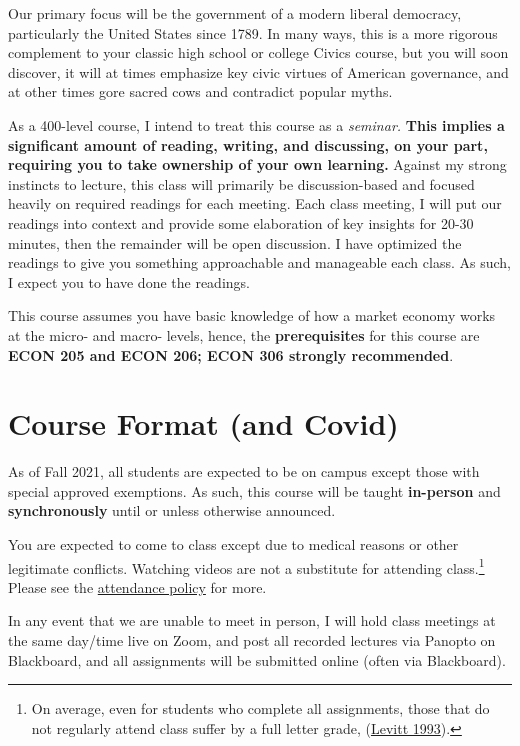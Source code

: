 \documentclass{article}
\begin{document}
Our primary focus will be the government of a modern liberal democracy,
particularly the United States since 1789. In many ways, this is a more
rigorous complement to your classic high school or college Civics
course, but you will soon discover, it will at times emphasize key civic
virtues of American governance, and at other times gore sacred cows and
contradict popular myths.

{As a 400-level course}, I intend to treat this course as a
\emph{seminar.} \textbf{This implies a significant amount of reading,
writing, and discussing, on your part, requiring you to take ownership
of your own learning.} Against my strong instincts to lecture, this
class will primarily be discussion-based and focused heavily on required
readings for each meeting. Each class meeting, I will put our readings
into context and provide some elaboration of key insights for 20-30
minutes, then the remainder will be open discussion. I have optimized
the readings to give you something approachable and manageable each
class. As such, I expect you to have done the readings.

This course assumes you have basic knowledge of how a market economy
works at the micro- and macro- levels, hence, the \textbf{prerequisites}
for this course are \textbf{ECON 205 and ECON 206; ECON 306 strongly
recommended}.

\hypertarget{course-format-and-covid}{%
\section{Course Format (and Covid)}\label{course-format-and-covid}}

As of Fall 2021, all students are expected to be on campus except those
with special approved exemptions. As such, this course will be taught
\textbf{in-person} and \textbf{synchronously} until or unless otherwise
announced.

You are expected to come to class except due to medical reasons or other
legitimate conflicts. Watching videos are not a substitute for attending
class.\footnote{On average, even for students who complete all
  assignments, those that do not regularly attend class suffer by a full
  letter grade,
  (\href{https://www.aeaweb.org/articles?id=10.1257/jep.7.3.167}{Levitt
  1993}).} Please see the \protect\hyperlink{attendance}{attendance
policy} for more.

In any event that we are unable to meet in person, I will hold class
meetings at the same day/time live on Zoom, and post all recorded
lectures via Panopto on Blackboard, and all assignments will be
submitted online (often via Blackboard).
\end{document}
